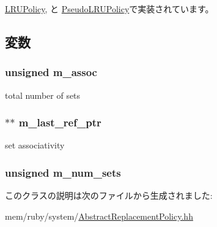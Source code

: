 \hyperlink{classLRUPolicy_a6d3ff52feacdaba90c7c0bfbe9f7f58a}{LRUPolicy}, と \hyperlink{classPseudoLRUPolicy_a6d3ff52feacdaba90c7c0bfbe9f7f58a}{PseudoLRUPolicy}で実装されています。

\subsection{変数}
\hypertarget{classAbstractReplacementPolicy_a8ad9d20c98fe601aa72716ddc5b97f2d}{
\subsubsection[{m\_\-assoc}]{\setlength{\rightskip}{0pt plus 5cm}unsigned {\bf m\_\-assoc}}}
\label{classAbstractReplacementPolicy_a8ad9d20c98fe601aa72716ddc5b97f2d}
total number of sets \hypertarget{classAbstractReplacementPolicy_a24a457a2854b5f62404b18272f5a3da3}{
\subsubsection[{m\_\-last\_\-ref\_\-ptr}]{$\ast$$\ast$ {\bf m\_\-last\_\-ref\_\-ptr}}}
\label{classAbstractReplacementPolicy_a24a457a2854b5f62404b18272f5a3da3}
set associativity \hypertarget{classAbstractReplacementPolicy_a02f70f06d6633b7809066c8bd63a6a3e}{
\subsubsection[{m\_\-num\_\-sets}]{\setlength{\rightskip}{0pt plus 5cm}unsigned {\bf m\_\-num\_\-sets}}}
\label{classAbstractReplacementPolicy_a02f70f06d6633b7809066c8bd63a6a3e}


このクラスの説明は次のファイルから生成されました:\begin{DoxyCompactItemize}
\item 
mem/ruby/system/\hyperlink{AbstractReplacementPolicy_8hh}{AbstractReplacementPolicy.hh}\end{DoxyCompactItemize}
